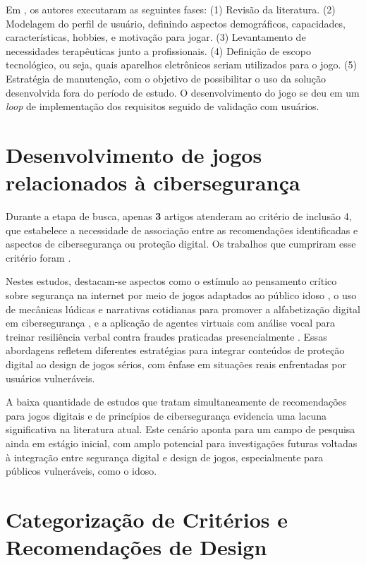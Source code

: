 Em \cite{manser2021making}, os autores executaram as seguintes fases: (1) Revisão da literatura. (2) Modelagem do perfil de usuário, definindo aspectos demográficos, capacidades, características, hobbies, e motivação para jogar. (3) Levantamento de necessidades terapêuticas junto a profissionais. (4) Definição de escopo tecnológico, ou seja, quais aparelhos eletrônicos seriam utilizados para o jogo. (5) Estratégia de manutenção, com o objetivo de possibilitar o uso da solução desenvolvida fora do período de estudo. O desenvolvimento do jogo se deu em um \textit{loop} de implementação dos requisitos seguido de validação com usuários.

\section{Desenvolvimento de jogos relacionados à cibersegurança}\label{sec:ciberseguranca}

Durante a etapa de busca, apenas \textbf{3} artigos atenderam ao critério de inclusão 4, que estabelece a necessidade de associação entre as recomendações identificadas e aspectos de cibersegurança ou proteção digital. Os trabalhos que cumpriram esse critério foram \cite{machado2017learning, bernardino2021serious, van2020serious}.

Nestes estudos, destacam-se aspectos como o estímulo ao pensamento crítico sobre segurança na internet por meio de jogos adaptados ao público idoso \cite{machado2017learning}, o uso de mecânicas lúdicas e narrativas cotidianas para promover a alfabetização digital em cibersegurança \cite{bernardino2021serious}, e a aplicação de agentes virtuais com análise vocal para treinar resiliência verbal contra fraudes praticadas presencialmente \cite{van2020serious}. Essas abordagens refletem diferentes estratégias para integrar conteúdos de proteção digital ao design de jogos sérios, com ênfase em situações reais enfrentadas por usuários vulneráveis.

A baixa quantidade de estudos que tratam simultaneamente de recomendações para jogos digitais e de princípios de cibersegurança evidencia uma lacuna significativa na literatura atual. Este cenário aponta para um campo de pesquisa ainda em estágio inicial, com amplo potencial para investigações futuras voltadas à integração entre segurança digital e design de jogos, especialmente para públicos vulneráveis, como o idoso.

\section{Categorização de Critérios e Recomendações de Design}
\label{sec:categorizacao}

